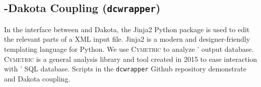 \subsection{\Cyclus-Dakota Coupling (\texttt{dcwrapper})}
In the interface between \Cyclus and Dakota, 
the Jinja2 \cite{ronacher_welcome_2018} Python package is used 
to edit the relevant parts of a \Cyclus XML input file. 
Jinja2 is a modern and designer-friendly templating 
language for Python. 
We use \textsc{Cymetric} to analyze \Cyclus' output database. 
\textsc{Cymetric} \cite{scopatz_cymetric_2015} is a general analysis library and 
tool created in 2015 to ease interaction with \Cyclus' SQL database. 
Scripts in the \texttt{dcwrapper} Github repository \cite{chee_arfc/dcwrapper_2019}
demonstrate \Cyclus and Dakota coupling. 



